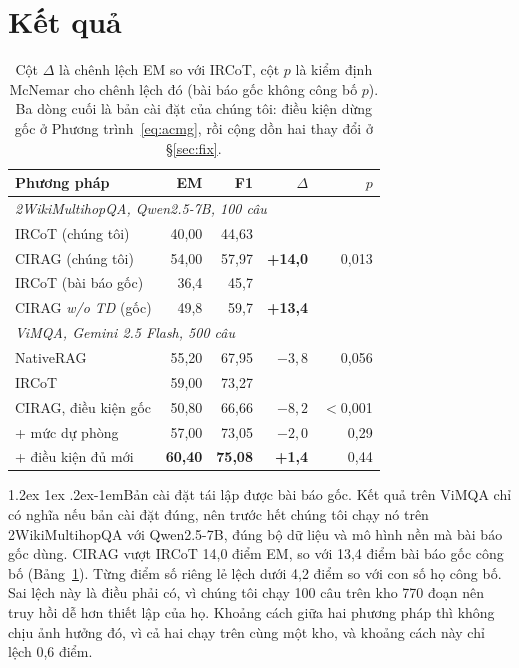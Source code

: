 \documentclass[11pt]{article}
\makeatletter
\renewcommand\paragraph{\@startsection{paragraph}{4}{\z@}%
  {1.2ex \@plus1ex \@minus.2ex}{-1em}{\normalfont\normalsize\bfseries}}
\makeatother
\begin{document}
\section{Kết quả}
\label{sec:results}

\begin{table}[t]
\centering\footnotesize
\setlength{\tabcolsep}{2.5pt}
\begin{tabular}{lrrrr}
\toprule
\textbf{Phương pháp} & \textbf{EM} & \textbf{F1} & \textbf{$\Delta$} & \textbf{$p$} \\
\midrule
\multicolumn{5}{l}{\emph{2WikiMultihopQA, Qwen2.5-7B, 100 câu}} \\
\quad IRCoT (chúng tôi)   & 40,00 & 44,63 & & \\
\quad CIRAG (chúng tôi)   & 54,00 & 57,97 & \textbf{+14,0} & 0,013 \\
\quad IRCoT (bài báo gốc) & 36,4 & 45,7 & & \\
\quad CIRAG \emph{w/o TD} (gốc) & 49,8 & 59,7 & \textbf{+13,4} & \\
\midrule
\multicolumn{5}{l}{\emph{ViMQA, Gemini 2.5 Flash, 500 câu}} \\
\quad NativeRAG & 55,20 & 67,95 & $-3{,}8$ & 0,056 \\
\quad IRCoT     & 59,00 & 73,27 & & \\
\quad CIRAG, điều kiện gốc & 50,80 & 66,66 & $-8{,}2$ & $<$0,001 \\
\quad \; + mức dự phòng & 57,00 & 73,05 & $-2{,}0$ & 0,29 \\
\quad \; + điều kiện đủ mới & \textbf{60,40} & \textbf{75,08} & \textbf{+1,4} & 0,44 \\
\bottomrule
\end{tabular}
\caption{Cột $\Delta$ là chênh lệch EM so với IRCoT, cột $p$ là kiểm định McNemar cho chênh
lệch đó (bài báo gốc không công bố $p$). Ba dòng cuối là bản cài đặt của chúng tôi: điều kiện
dừng gốc ở Phương trình~\ref{eq:acmg}, rồi cộng dồn hai thay đổi ở \S\ref{sec:fix}.}
\vspace{-0.5em}
\label{tab:main}
\end{table}

\paragraph{Bản cài đặt tái lập được bài báo gốc.} Kết quả trên ViMQA chỉ có nghĩa nếu bản
cài đặt đúng, nên trước hết chúng tôi chạy nó trên 2WikiMultihopQA với Qwen2.5-7B, đúng bộ
dữ liệu và mô hình nền mà bài báo gốc dùng. CIRAG vượt IRCoT 14,0 điểm EM, so với 13,4 điểm
bài báo gốc công bố (Bảng~\ref{tab:main}). Từng điểm số riêng lẻ lệch dưới 4,2 điểm so với con
số họ công bố. Sai lệch này là điều phải có, vì chúng tôi chạy 100 câu trên kho 770 đoạn nên
truy hồi dễ hơn thiết lập của họ. Khoảng cách giữa hai phương pháp thì không chịu ảnh hưởng
đó, vì cả hai chạy trên cùng một kho, và khoảng cách này chỉ lệch 0,6 điểm.
\end{document}
